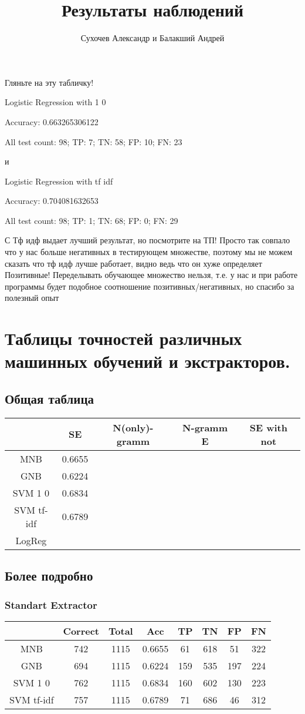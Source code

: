 \documentclass[a4paper, 12pt]{article}
\author{Сухочев Александр и Балакший Андрей}
\title{Результаты наблюдений}
\theoremstyle{plain}
\theoremstyle{definition}
\theoremstyle{remark}
\begin{document}
\maketitle

Гляньте на эту табличку!

Logistic Regression with 1 0

Accuracy: 0.663265306122

All test count: 98; TP: 7; TN: 58; FP: 10; FN: 23

и

Logistic Regression with tf idf

Accuracy: 0.704081632653

All test count: 98; TP: 1; TN: 68; FP: 0; FN: 29

С Тф идф выдает лучший результат, но посмотрите на ТП! Просто так совпало что у нас больше негативных в тестирующем множестве, поэтому мы не можем сказать что тф идф лучше работает, видно ведь что он хуже определяет Позитивные! Переделывать обучающее множество нельзя, т.е. у нас и при работе программы будет подобное соотношение позитивных/негативных, но спасибо за полезный опыт

\section{Таблицы точностей различных машинных обучений и экстракторов.}

\subsection{Общая таблица}
\begin{tabular} {|c|c|c|c|c|}
\hline
   ~~~~ & SE & N(only)-gramm & N-gramm E & SE with not \\
   \hline
  MNB & 0.6655 & & & \\
   \hline
  GNB & 0.6224 & & & \\
   \hline
  SVM 1 0 & 0.6834 & & & \\
   \hline
  SVM tf-idf & 0.6789 & & & \\
   \hline
  LogReg & & & & \\
\hline
\end{tabular}

\subsection{Более подробно}
\subsubsection{Standart Extractor}
\begin{tabular}{|c|c|c|c|c|c|c|c|}
\hline
  ~~~~ & Correct & Total & Acc & TP & TN & FP & FN \\
  \hline
  MNB & 742 & 1115 & 0.6655 & 61 & 618 & 51 & 322  \\
  \hline
  GNB & 694 & 1115 & 0.6224 & 159 & 535 & 197 & 224 \\
  \hline
  SVM 1 0 & 762 & 1115 & 0.6834 & 160 & 602 & 130 & 223 \\
  \hline
  SVM tf-idf & 757 & 1115 & 0.6789 & 71 & 686 & 46 & 312 \\
\hline
\end{tabular}
\end{document}
